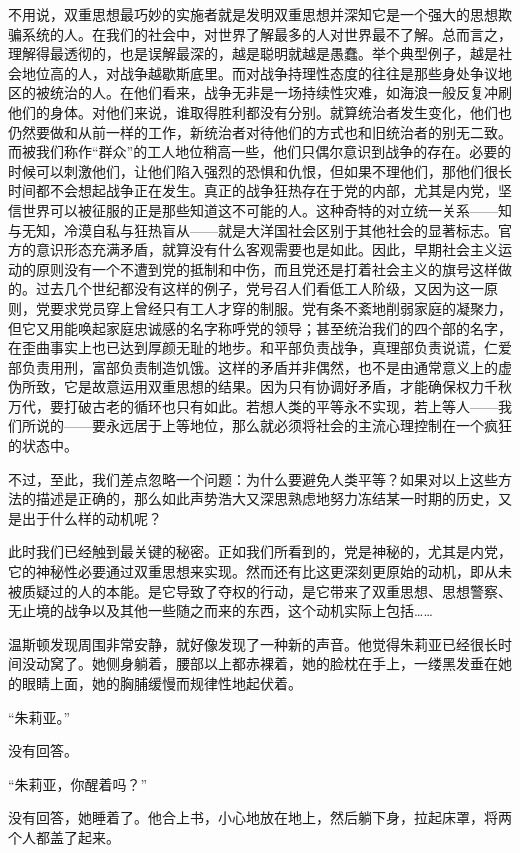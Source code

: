 不用说，双重思想最巧妙的实施者就是发明双重思想并深知它是一个强大的思想欺骗系统的人。在我们的社会中，对世界了解最多的人对世界最不了解。总而言之，理解得最透彻的，也是误解最深的，越是聪明就越是愚蠢。举个典型例子，越是社会地位高的人，对战争越歇斯底里。而对战争持理性态度的往往是那些身处争议地区的被统治的人。在他们看来，战争无非是一场持续性灾难，如海浪一般反复冲刷他们的身体。对他们来说，谁取得胜利都没有分别。就算统治者发生变化，他们也仍然要做和从前一样的工作，新统治者对待他们的方式也和旧统治者的别无二致。而被我们称作``群众''的工人地位稍高一些，他们只偶尔意识到战争的存在。必要的时候可以刺激他们，让他们陷入强烈的恐惧和仇恨，但如果不理他们，那他们很长时间都不会想起战争正在发生。真正的战争狂热存在于党的内部，尤其是内党，坚信世界可以被征服的正是那些知道这不可能的人。这种奇特的对立统一关系------知与无知，冷漠自私与狂热盲从------就是大洋国社会区别于其他社会的显著标志。官方的意识形态充满矛盾，就算没有什么客观需要也是如此。因此，早期社会主义运动的原则没有一个不遭到党的抵制和中伤，而且党还是打着社会主义的旗号这样做的。过去几个世纪都没有这样的例子，党号召人们看低工人阶级，又因为这一原则，党要求党员穿上曾经只有工人才穿的制服。党有条不紊地削弱家庭的凝聚力，但它又用能唤起家庭忠诚感的名字称呼党的领导；甚至统治我们的四个部的名字，在歪曲事实上也已达到厚颜无耻的地步。和平部负责战争，真理部负责说谎，仁爱部负责用刑，富部负责制造饥饿。这样的矛盾并非偶然，也不是由通常意义上的虚伪所致，它是故意运用双重思想的结果。因为只有协调好矛盾，才能确保权力千秋万代，要打破古老的循环也只有如此。若想人类的平等永不实现，若上等人------我们所说的------要永远居于上等地位，那么就必须将社会的主流心理控制在一个疯狂的状态中。

不过，至此，我们差点忽略一个问题：为什么要避免人类平等？如果对以上这些方法的描述是正确的，那么如此声势浩大又深思熟虑地努力冻结某一时期的历史，又是出于什么样的动机呢？

此时我们已经触到最关键的秘密。正如我们所看到的，党是神秘的，尤其是内党，它的神秘性必要通过双重思想来实现。然而还有比这更深刻更原始的动机，即从未被质疑过的人的本能。是它导致了夺权的行动，是它带来了双重思想、思想警察、无止境的战争以及其他一些随之而来的东西，这个动机实际上包括\ldots\ldots{}

温斯顿发现周围非常安静，就好像发现了一种新的声音。他觉得朱莉亚已经很长时间没动窝了。她侧身躺着，腰部以上都赤裸着，她的脸枕在手上，一缕黑发垂在她的眼睛上面，她的胸脯缓慢而规律性地起伏着。

``朱莉亚。''

没有回答。

``朱莉亚，你醒着吗？''

没有回答，她睡着了。他合上书，小心地放在地上，然后躺下身，拉起床罩，将两个人都盖了起来。

